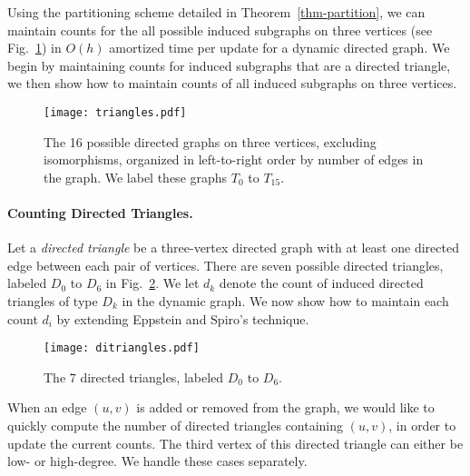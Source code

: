 \documentclass[11pt]{article}
\renewcommand{\subsection}[1]{\paragraph{\textbf{#1}.}}
\begin{document}
Using the partitioning scheme detailed in Theorem~\ref{thm-partition}, we
can maintain counts for the all possible induced subgraphs on three vertices (see 
Fig.~\ref{fig-triangles}) in $O(h)$ amortized time per update for a dynamic
directed graph. We begin by maintaining counts for induced subgraphs that are a
directed triangle, we then show how to maintain counts of all induced
subgraphs on three vertices.

\begin{figure}[hb!]
\vspace{-24pt}
\begin{center}
\texttt{[image: triangles.pdf]}
\end{center}
\vspace{-24pt}
\caption{The 16 possible directed graphs on three vertices, excluding 
isomorphisms, organized in left-to-right order by number of edges in the graph. We
label these graphs $T_0$ to $T_{15}$.}
\label{fig-triangles}
\vspace{-18pt}
\end{figure}

\subsection{Counting Directed Triangles}

Let a \emph{directed triangle} be a three-vertex directed graph 
with at least one directed edge between each pair of vertices. There
are seven possible directed triangles, labeled $D_0$ to $D_6$ in 
Fig.~\ref{fig-ditriangles}. We let $d_k$ denote the count of induced directed 
triangles of type $D_k$ in the dynamic graph. We now show how to maintain  
each count $d_i$ by extending Eppstein and Spiro's technique.
\begin{figure}[hb!]
\vspace{-24pt}
\begin{center}
\texttt{[image: ditriangles.pdf]}
\end{center}
\vspace{-24pt}
\caption{The 7 directed triangles, labeled $D_0$ to $D_6$.}
\label{fig-ditriangles}
\vspace{-12pt}
\end{figure}

\ifFull
When an edge $(u,v)$ is added or removed from the graph, we would like 
to quickly compute the number of directed triangles containing $(u,v)$,
in order to update the current counts. The third vertex of this
directed triangle can either be low- or high-degree. We handle these
cases separately.\fi
\end{document}
